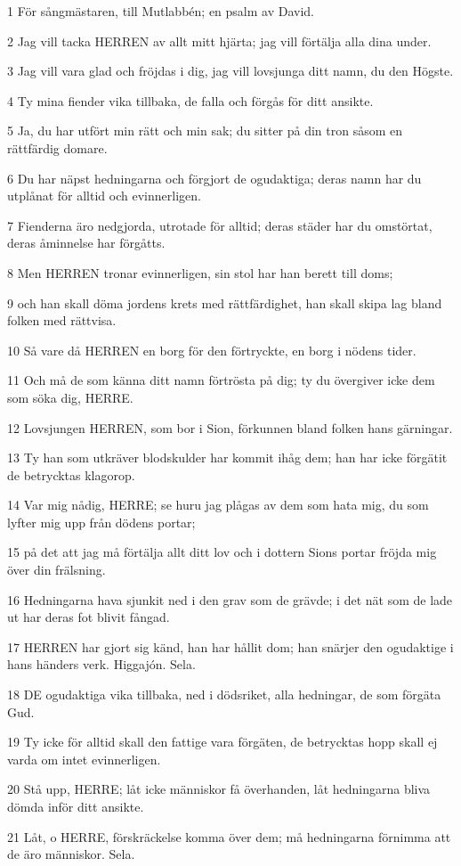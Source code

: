\par 1 För sångmästaren, till Mutlabbén; en psalm av David.
\par 2 Jag vill tacka HERREN av allt mitt hjärta; jag vill förtälja alla dina under.
\par 3 Jag vill vara glad och fröjdas i dig, jag vill lovsjunga ditt namn, du den Högste.
\par 4 Ty mina fiender vika tillbaka, de falla och förgås för ditt ansikte.
\par 5 Ja, du har utfört min rätt och min sak; du sitter på din tron såsom en rättfärdig domare.
\par 6 Du har näpst hedningarna och förgjort de ogudaktiga; deras namn har du utplånat för alltid och evinnerligen.
\par 7 Fienderna äro nedgjorda, utrotade för alltid; deras städer har du omstörtat, deras åminnelse har förgåtts.
\par 8 Men HERREN tronar evinnerligen, sin stol har han berett till doms;
\par 9 och han skall döma jordens krets med rättfärdighet, han skall skipa lag bland folken med rättvisa.
\par 10 Så vare då HERREN en borg för den förtryckte, en borg i nödens tider.
\par 11 Och må de som känna ditt namn förtrösta på dig; ty du övergiver icke dem som söka dig, HERRE.
\par 12 Lovsjungen HERREN, som bor i Sion, förkunnen bland folken hans gärningar.
\par 13 Ty han som utkräver blodskulder har kommit ihåg dem; han har icke förgätit de betrycktas klagorop.
\par 14 Var mig nådig, HERRE; se huru jag plågas av dem som hata mig, du som lyfter mig upp från dödens portar;
\par 15 på det att jag må förtälja allt ditt lov och i dottern Sions portar fröjda mig över din frälsning.
\par 16 Hedningarna hava sjunkit ned i den grav som de grävde; i det nät som de lade ut har deras fot blivit fångad.
\par 17 HERREN har gjort sig känd, han har hållit dom; han snärjer den ogudaktige i hans händers verk. Higgajón. Sela.
\par 18 DE ogudaktiga vika tillbaka, ned i dödsriket, alla hedningar, de som förgäta Gud.
\par 19 Ty icke för alltid skall den fattige vara förgäten, de betrycktas hopp skall ej varda om intet evinnerligen.
\par 20 Stå upp, HERRE; låt icke människor få överhanden, låt hedningarna bliva dömda inför ditt ansikte.
\par 21 Låt, o HERRE, förskräckelse komma över dem; må hedningarna förnimma att de äro människor. Sela.


